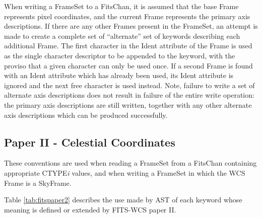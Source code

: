 \documentclass[twoside,11pt]{article}
\begin{document}
When writing a FrameSet to a FitsChan, it is assumed that the base Frame
represents pixel coordinates, and the current Frame represents the
primary axis descriptions. If there are any other Frames present in the
FrameSet, an attempt is made to create a complete set of ``alternate''
set of keywords describing each additional Frame. The first character in
the Ident attribute of the Frame is used as the single character
descriptor to be appended to the keyword, with the proviso that a given
character can only be used once. If a second Frame is found with an Ident
attribute which has already been used, its Ident attribute is ignored and
the next free character is used instead. Note, failure to write a set of
alternate axis descriptions does not result in failure of the entire
write operation: the primary axis descriptions are still written,
together with any other alternate axis descriptions which can be produced
successfully.

\subsection{Paper II - Celestial Coordinates}
These conventions are used when reading a FrameSet
from a FitsChan containing appropriate CTYPE\emph{i}
values, and when writing a FrameSet in which the WCS Frame
is a SkyFrame.

Table \ref{tab:fitspaper2} describes the use made by AST of each keyword
whose meaning is defined or extended by FITS-WCS paper II.
\end{document}
